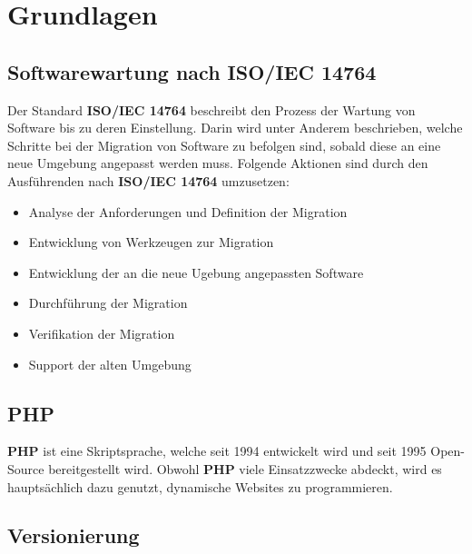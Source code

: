 \chapter{Grundlagen}\label{ch:grundlagen}

\section{Softwarewartung nach ISO/IEC 14764}
Der Standard \textbf{ISO/IEC 14764} beschreibt den Prozess der Wartung von Software bis zu deren Einstellung.
Darin wird unter Anderem beschrieben, welche Schritte bei der Migration von Software zu befolgen sind, sobald diese an eine neue Umgebung angepasst werden muss.
Folgende Aktionen sind durch den Ausführenden nach \textbf{ISO/IEC 14764} umzusetzen:
\begin{itemize}
    \item Analyse der Anforderungen und Definition der Migration
    \item Entwicklung von Werkzeugen zur Migration
    \item Entwicklung der an die neue Ugebung angepassten Software
    \item Durchführung der Migration
    \item Verifikation der Migration
    \item Support der alten Umgebung
\end{itemize}

\section{PHP}
\textbf{\ac{PHP}} ist eine Skriptsprache, welche seit 1994 entwickelt wird und seit 1995 Open-Source bereitgestellt wird.
Obwohl \textbf{PHP} viele Einsatzzwecke abdeckt, wird es hauptsächlich dazu genutzt, dynamische Websites zu programmieren.

\section{Versionierung}

